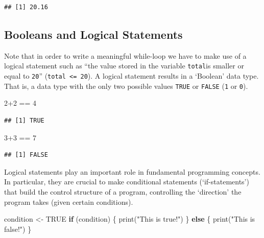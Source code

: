 \documentclass[
  12pt,
]{style/krantz}
\newenvironment{Shaded}{\begin{snugshade}}{\end{snugshade}}
\newcommand{\ConstantTok}[1]{\textcolor[rgb]{0.00,0.00,0.00}{#1}}
\newcommand{\ControlFlowTok}[1]{\textcolor[rgb]{0.13,0.29,0.53}{\textbf{#1}}}
\newcommand{\DecValTok}[1]{\textcolor[rgb]{0.00,0.00,0.81}{#1}}
\newcommand{\FunctionTok}[1]{\textcolor[rgb]{0.00,0.00,0.00}{#1}}
\newcommand{\NormalTok}[1]{#1}
\newcommand{\OtherTok}[1]{\textcolor[rgb]{0.56,0.35,0.01}{#1}}
\newcommand{\SpecialCharTok}[1]{\textcolor[rgb]{0.00,0.00,0.00}{#1}}
\newcommand{\StringTok}[1]{\textcolor[rgb]{0.31,0.60,0.02}{#1}}
\begin{document}
\begin{verbatim}
## [1] 20.16
\end{verbatim}

\hypertarget{booleans-and-logical-statements}{%
\subsection{Booleans and Logical Statements}\label{booleans-and-logical-statements}}

Note that in order to write a meaningful while-loop we have to make use of a logical statement such as ``the value stored in the variable \texttt{total}is smaller or equal to \texttt{20}'' (\texttt{total\ \textless{}=\ 20}). A logical statement results in a `Boolean' data type. That is, a data type with the only two possible values \texttt{TRUE} or \texttt{FALSE} (\texttt{1} or \texttt{0}).

\begin{Shaded}
\begin{Highlighting}[]
\DecValTok{2}\SpecialCharTok{+}\DecValTok{2} \SpecialCharTok{==} \DecValTok{4}
\end{Highlighting}
\end{Shaded}

\begin{verbatim}
## [1] TRUE
\end{verbatim}

\begin{Shaded}
\begin{Highlighting}[]
\DecValTok{3}\SpecialCharTok{+}\DecValTok{3} \SpecialCharTok{==} \DecValTok{7}
\end{Highlighting}
\end{Shaded}

\begin{verbatim}
## [1] FALSE
\end{verbatim}

Logical statements play an important role in fundamental programming concepts. In particular, they are crucial to make conditional statements (`if-statements') that build the control structure of a program, controlling the `direction' the program takes (given certain conditions).

\begin{Shaded}
\begin{Highlighting}[]
\NormalTok{condition }\OtherTok{\textless{}{-}} \ConstantTok{TRUE}
\ControlFlowTok{if}\NormalTok{ (condition) \{}
     \FunctionTok{print}\NormalTok{(}\StringTok{"This is true!"}\NormalTok{)}
\NormalTok{\} }\ControlFlowTok{else}\NormalTok{ \{}
     \FunctionTok{print}\NormalTok{(}\StringTok{"This is false!"}\NormalTok{)}
\NormalTok{\}}
\end{Highlighting}
\end{Shaded}
\end{document}
